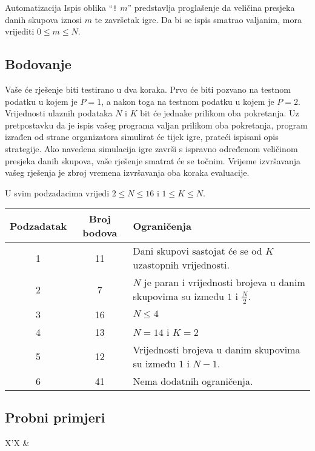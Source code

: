 \begin{statement}[
  problempoints=100,
  timelimit=1 sekunda,
  memorylimit=512 MiB,
]{Automatizacija}
Ispis oblika “\texttt{!} $m$” predstavlja proglašenje da veličina presjeka danih skupova 
iznosi $m$ te završetak igre. 
Da bi se ispis smatrao valjanim, mora vrijediti $0 \leq m \leq N$. 

\subsection*{Bodovanje}

Vaše će rješenje biti testirano u dva koraka. 
Prvo će biti pozvano na testnom podatku u kojem je $P = 1$, a nakon toga 
na testnom podatku u kojem je $P = 2$. 
Vrijednosti ulaznih podataka $N$ i $K$ bit će jednake prilikom oba pokretanja. 
Uz pretpostavku da je ispis vašeg programa valjan prilikom oba pokretanja, 
program izrađen od strane organizatora simulirat će tijek igre, prateći 
ispisani opis strategije. 
Ako navedena simulacija igre završi 
s ispravno određenom veličinom presjeka danih skupova, vaše rješenje 
smatrat će se točnim.
Vrijeme izvršavanja vašeg rješenja je zbroj vremena izvršavanja oba koraka evaluacije. 

U svim podzadacima vrijedi $2 \leq N \leq 16$ i $1 \leq K \leq N$.

{\renewcommand{\arraystretch}{1.4}
  \setlength{\tabcolsep}{6pt}
  \begin{tabular}{ccl}
   Podzadatak & Broj bodova & Ograničenja \\ \midrule
    1 & 11 & Dani skupovi sastojat će se od $K$ uzastopnih vrijednosti. \\
    2 & 7 & $N$ je paran i vrijednosti brojeva u danim skupovima su između $1$ i $\frac{N}{2}$. \\
    3 & 16 & $N \leq 4$ \\
    4 & 13 & $N = 14$ i $K = 2$ \\
    5 & 12 & Vrijednosti brojeva u danim skupovima su između $1$ i $N - 1$. \\
    6 & 41 & Nema dodatnih ograničenja.
\end{tabular}}

\subsection*{Probni primjeri}
\begin{tabularx}{\textwidth}{X'X}
 &
\end{tabularx}


\end{statement}
